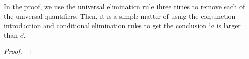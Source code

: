 \smallskip
In the proof, we use the universal elimination rule three times to remove each of the universal quantifiers. Then, it is a simple matter of using the conjunction introduction and conditional elimination rules to get the conclusion `$a$ is larger than $c$'.


\begin{proof}
	 \pr{}
	 \pr{}
	 \pr{}
	 
	 
	 
	 
	 
\end{proof}


